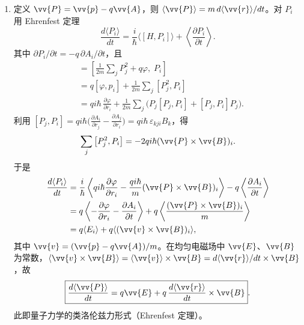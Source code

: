 \begin{enumerate}
{\begin{enumerate}
		\item 定义 $\vv{P}=\vv{p}-q\vv{A}$，则 $\langle\vv{P}\rangle=m\,d\langle\vv{r}\rangle/dt$。对 $P_i$ 用 Ehrenfest 定理
		\[
		\frac{d\langle P_i\rangle}{dt}=\frac{i}{\hbar}\langle[H,P_i]\rangle+\left\langle\frac{\partial P_i}{\partial t}\right\rangle.
		\]
		其中 $\partial P_i/\partial t=-q\,\partial A_i/\partial t$，且
		\begin{align*}
		[H,P_i]&=\left[\frac{1}{2m}\sum_jP_j^2+q\varphi,\;P_i\right]\\
		&=q\left[\varphi,p_i\right]+\frac{1}{2m}\sum_j\left[P_j^2,P_i\right]\\
		&=qi\hbar\,\frac{\partial\varphi}{\partial r_i}+\frac{1}{2m}\sum_j\bigl(P_j[P_j,P_i]+[P_j,P_i]P_j\bigr).
		\end{align*}
		利用 $[P_j,P_i]=qi\hbar\bigl(\frac{\partial A_i}{\partial r_j}-\frac{\partial A_j}{\partial r_i}\bigr)=qi\hbar\,\varepsilon_{kji}B_k$，得
		\[
		\sum_j\left[P_j^2,P_i\right]=-2qi\hbar(\vv{P}\times\vv{B})_i.
		\]
		于是
		\begin{align*}
		\frac{d\langle P_i\rangle}{dt}&=\frac{i}{\hbar}\left\langle qi\hbar\frac{\partial\varphi}{\partial r_i}-\frac{qi\hbar}{m}(\vv{P}\times\vv{B})_i\right\rangle-q\left\langle\frac{\partial A_i}{\partial t}\right\rangle\\
		&=q\left\langle-\frac{\partial\varphi}{\partial r_i}-\frac{\partial A_i}{\partial t}\right\rangle+q\left\langle\frac{(\vv{P}\times\vv{B})_i}{m}\right\rangle\\
		&=q\langle E_i\rangle+q\langle(\vv{v}\times\vv{B})_i\rangle,
		\end{align*}
		其中 $\vv{v}=(\vv{p}-q\vv{A})/m$。在均匀电磁场中 $\vv{E}$、$\vv{B}$ 为常数，$\langle\vv{v}\times\vv{B}\rangle=\langle\vv{v}\rangle\times\vv{B}=d\langle\vv{r}\rangle/dt\times\vv{B}$，故
		\[
		\boxed{\frac{d\langle\vv{P}\rangle}{dt}=q\vv{E}+q\,\frac{d\langle\vv{r}\rangle}{dt}\times\vv{B}}.
		\]
		此即量子力学的类洛伦兹力形式（Ehrenfest 定理）。
	\end{enumerate}
}

 
 
\end{enumerate}
